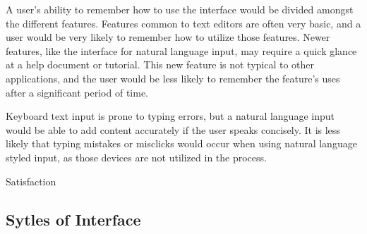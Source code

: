 \documentclass[11pt, oneside]{article}
\begin{document}
A user's ability to remember how to use the interface would be divided amongst the different features. Features common to text editors are often very basic, and a user would be very likely to remember how to utilize those features. Newer features, like the interface for natural language input, may require a quick glance at a help document or tutorial. This new feature is not typical to other applications, and the user would be less likely to remember the feature's uses after a significant period of time.

Keyboard text input is prone to typing errors, but a natural language input would be able to add content accurately if the user speaks concisely. It is less likely that typing mistakes or misclicks would occur when using natural language styled input, as those devices are not utilized in the process. 

Satisfaction



\subsection{Sytles of Interface}

\end{document}
